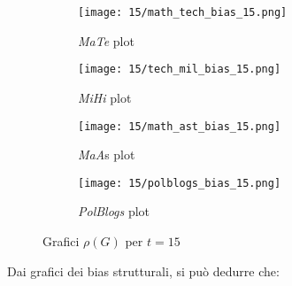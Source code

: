 \newpage
\begin{figure}[!h]
    \centering
\begin{subfigure}[b]{0.4\textwidth}
    \centering
    \texttt{[image: 15/math\_tech\_bias\_15.png]}
    \caption{\emph{MaTe} plot}\label{fig:mate_b_15}
\end{subfigure}
\hspace{0.1\columnwidth}
\begin{subfigure}[b]{0.4\textwidth}
    \centering
    \texttt{[image: 15/tech\_mil\_bias\_15.png]}
    \caption{\emph{MiHi} plot}\label{fig:mihi_b_15}
\end{subfigure}

\begin{subfigure}[b]{0.4\textwidth}
    \centering
    \texttt{[image: 15/math\_ast\_bias\_15.png]}
    \caption{\emph{MaA}s plot}\label{fig:maas_b_15}
\end{subfigure}
\hspace{0.1\columnwidth}
\begin{subfigure}[b]{0.4\textwidth}
    \centering
    \texttt{[image: 15/polblogs\_bias\_15.png]}
    \caption{\emph{PolBlogs} plot}\label{fig:polblogs_b_15}
\end{subfigure}
\caption{Grafici $\rho(G)$ per $t=15$}
\end{figure}
Dai grafici dei bias strutturali, si può dedurre che:
